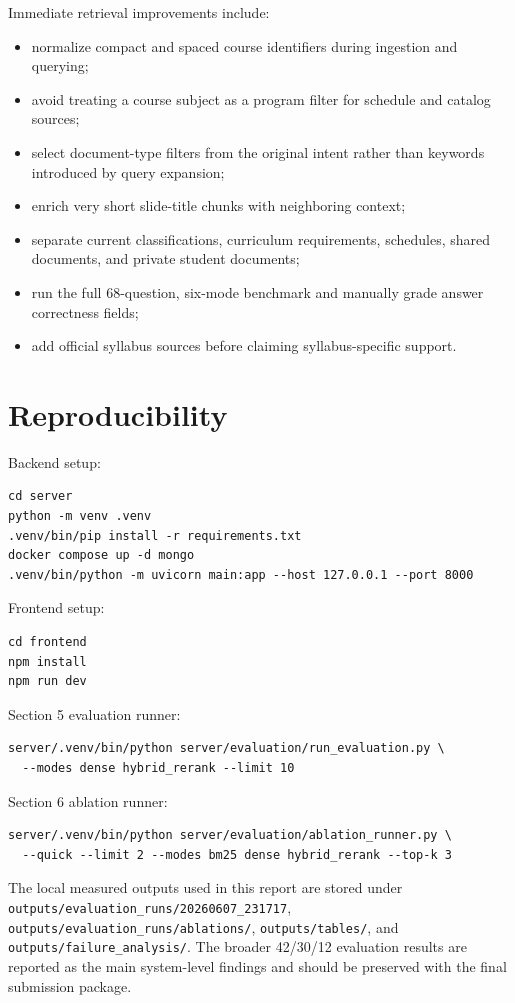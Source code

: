 \documentclass[10pt,a4paper]{article}
\newcommand{\code}[1]{\texttt{\small #1}}
\begin{document}
Immediate retrieval improvements include:
\begin{itemize}
    \item normalize compact and spaced course identifiers during ingestion and querying;
    \item avoid treating a course subject as a program filter for schedule and catalog sources;
    \item select document-type filters from the original intent rather than keywords introduced by query expansion;
    \item enrich very short slide-title chunks with neighboring context;
    \item separate current classifications, curriculum requirements, schedules, shared documents, and private student documents;
    \item run the full 68-question, six-mode benchmark and manually grade answer correctness fields;
    \item add official syllabus sources before claiming syllabus-specific support.
\end{itemize}

\section{Reproducibility}

Backend setup:
\begin{verbatim}
cd server
python -m venv .venv
.venv/bin/pip install -r requirements.txt
docker compose up -d mongo
.venv/bin/python -m uvicorn main:app --host 127.0.0.1 --port 8000
\end{verbatim}

Frontend setup:
\begin{verbatim}
cd frontend
npm install
npm run dev
\end{verbatim}

Section 5 evaluation runner:
\begin{verbatim}
server/.venv/bin/python server/evaluation/run_evaluation.py \
  --modes dense hybrid_rerank --limit 10
\end{verbatim}

Section 6 ablation runner:
\begin{verbatim}
server/.venv/bin/python server/evaluation/ablation_runner.py \
  --quick --limit 2 --modes bm25 dense hybrid_rerank --top-k 3
\end{verbatim}

The local measured outputs used in this report are stored under \code{outputs/evaluation\_runs/20260607\_231717}, \code{outputs/evaluation\_runs/ablations/}, \code{outputs/tables/}, and \code{outputs/failure\_analysis/}. The broader 42/30/12 evaluation results are reported as the main system-level findings and should be preserved with the final submission package.
\end{document}
